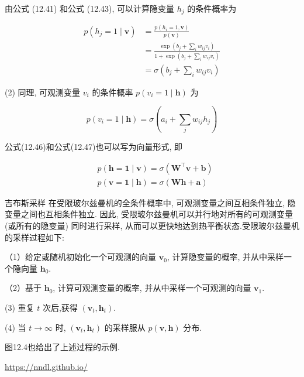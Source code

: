 \documentclass[10pt]{article}
\begin{document}
由公式 (12.41) 和公式 (12.43), 可以计算隐变量 $h_{j}$ 的条件概率为


\begin{align*}
p\left(h_{j}=1 \mid \boldsymbol{v}\right) & =\frac{p\left(h_{i}=1, \boldsymbol{v}\right)}{p(\boldsymbol{v})}  \tag{12.44}\\
& =\frac{\exp \left(b_{j}+\sum_{i} w_{i j} v_{i}\right)}{1+\exp \left(b_{j}+\sum_{i} w_{i j} v_{i}\right)}  \tag{12.45}\\
& =\sigma\left(b_{j}+\sum_{i} w_{i j} v_{i}\right) \tag{12.46}
\end{align*}


(2) 同理, 可观测变量 $v_{i}$ 的条件概率 $p\left(v_{i}=1 \mid \boldsymbol{h}\right)$ 为


\begin{equation*}
p\left(v_{i}=1 \mid \boldsymbol{h}\right)=\sigma\left(a_{i}+\sum_{j} w_{i j} h_{j}\right) \tag{12.47}
\end{equation*}


公式(12.46)和公式(12.47)也可以写为向量形式, 即


\begin{align*}
& p(\boldsymbol{h}=\mathbf{1} \mid \boldsymbol{v})=\sigma\left(\boldsymbol{W}^{\top} \boldsymbol{v}+\boldsymbol{b}\right)  \tag{12.48}\\
& p(\boldsymbol{v}=\mathbf{1} \mid \boldsymbol{h})=\sigma(\boldsymbol{W} \boldsymbol{h}+\boldsymbol{a}) \tag{12.49}
\end{align*}


吉布斯采样 在受限玻尔兹曼机的全条件概率中, 可观测变量之间互相条件独立, 隐变量之间也互相条件独立. 因此, 受限玻尔兹曼机可以并行地对所有的可观测变量 (或所有的隐变量) 同时进行采样, 从而可以更快地达到热平衡状态.受限玻尔兹曼机的采样过程如下:

（1）给定或随机初始化一个可观测的向量 $\boldsymbol{v}_{0}$, 计算隐变量的概率, 并从中采样一个隐向量 $\boldsymbol{h}_{0}$.

（2）基于 $\boldsymbol{h}_{0}$, 计算可观测变量的概率, 并从中采样一个可观测的向量 $\boldsymbol{v}_{1}$.

(3) 重复 $t$ 次后,获得 $\left(\boldsymbol{v}_{t}, \boldsymbol{h}_{t}\right)$.

(4) 当 $t \rightarrow \infty$ 时, $\left(\boldsymbol{v}_{t}, \boldsymbol{h}_{t}\right)$ 的采样服从 $p(\boldsymbol{v}, \boldsymbol{h})$ 分布.

图12.4也给出了上述过程的示例.

\href{https://nndl.github.io/}{https://nndl.github.io/}
\end{document}
